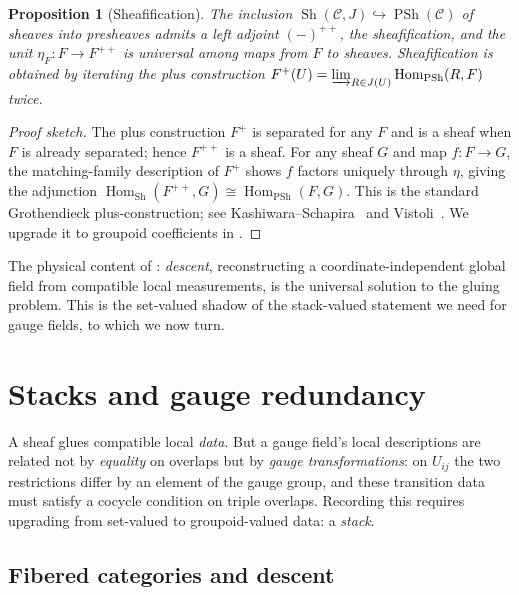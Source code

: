\documentclass[12pt]{article}
\newtheorem{proposition}[theorem]{Proposition}
\theoremstyle{definition}
\theoremstyle{remark}
\newcommand{\cat}[1]{\mathcal{#1}}
\newcommand{\Hom}{\operatorname{Hom}}
\DeclareMathOperator{\Sheaves}{Sh}
\DeclareMathOperator{\PSh}{PSh}
\begin{document}
\begin{proposition}[Sheafification]
\label{prop:sheafification}
The inclusion $\Sheaves(\cat C, J)\hookrightarrow\PSh(\cat C)$ of sheaves into
presheaves admits a left adjoint $(-)^{+\!+}$, the \emph{sheafification}, and the unit
$\eta_F: F\to F^{+\!+}$ is universal among maps from $F$ to sheaves. Sheafification is
obtained by iterating the \emph{plus construction}
$F^+(U)=\varinjlim_{R\in J(U)}\Hom_{\PSh}(R,F)$ twice.
\end{proposition}

\begin{proof}[Proof sketch]
The plus construction $F^+$ is separated for any $F$ and is a sheaf when $F$ is already
separated; hence $F^{+\!+}$ is a sheaf. For any sheaf $G$ and map $f:F\to G$, the
matching-family description of $F^+$ shows $f$ factors uniquely through $\eta$, giving
the adjunction $\Hom_{\Sheaves}(F^{+\!+},G)\cong\Hom_{\PSh}(F,G)$. This is the standard
Grothendieck plus-construction; see Kashiwara--Schapira~\cite{KashiwaraSchapira} and
Vistoli~\cite{Vistoli}. We upgrade it to
groupoid coefficients in .
\end{proof}

The physical content of : \emph{descent}, reconstructing a
coordinate-independent global field from compatible local measurements, is the
universal solution to the gluing problem. This is the set-valued shadow of the
stack-valued statement we need for gauge fields, to which we now turn.

\section{Stacks and gauge redundancy}
\label{sec:stacks}

A sheaf glues compatible local \emph{data}. But a gauge field's local descriptions are
related not by \emph{equality} on overlaps but by \emph{gauge transformations}: on
$U_{ij}$ the two restrictions differ by an element of the gauge group, and these
transition data must satisfy a cocycle condition on triple overlaps. Recording this
requires upgrading from set-valued to groupoid-valued data: a \emph{stack}.

\subsection{Fibered categories and descent}
\end{document}
